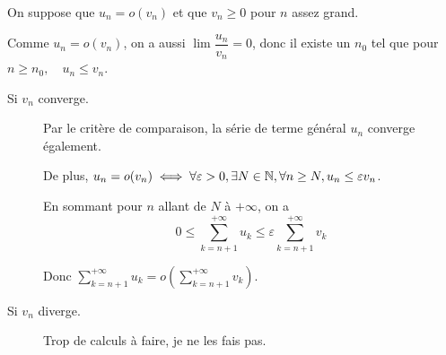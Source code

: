 \documentclass[a4paper, 12pt]{article}
\begin{document}
\begin{demonstration}
    On suppose que $u_n = o(v_n)$ et que $v_n \geq 0$ pour $n$ assez grand.

    Comme $u_n = o(v_n)$, on a aussi $\lim \dfrac{u_n}{v_n} = 0$,
    donc il existe un $n_0$ tel que pour $n \geq n_0, \quad u_n \leq v_n$.

    \begin{description}
        \item[Si $v_n$ converge.]
        Par le critère de comparaison, la série de terme général $u_n$ converge également.

        De plus, $u_n = o(v_n) \iff \forall \varepsilon > 0, \exists N \in \mathbb{N}, \forall n \geq N, u_n \leq \varepsilon v_n$.

        En sommant pour $n$ allant de $N$ à $+\infty$, on a
        $$
        0 \leq \sum\limits_{k=n+1}^{+\infty} u_k \leq \varepsilon \sum\limits_{k=n+1}^{+\infty} v_k
        $$

        Donc $\sum\limits_{k=n+1}^{+\infty} u_k = o\left( \sum\limits_{k=n+1}^{+\infty} v_k \right)$.
        
        \item[Si $v_n$ diverge.]\n
        \begin{hotwarn}
            Trop de calculs à faire, je ne les fais pas.
        \end{hotwarn}
    \end{description}
\end{demonstration}
\end{document}
